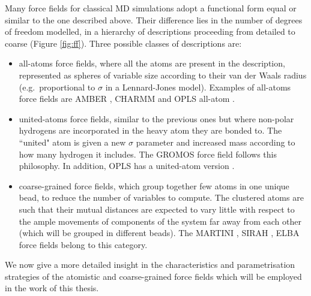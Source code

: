 Many force fields for classical MD simulations adopt a functional form equal or similar to the one described above. Their difference lies in the number of degrees of freedom modelled, in a hierarchy of descriptions proceeding from detailed to coarse (Figure \ref{fig:ff}). Three possible classes of descriptions are:
\begin{itemize}
\item all-atoms force fields, where all the atoms are present in the description, represented as spheres of variable size according to their van der Waals radius (e.g.\ proportional to $\sigma$ in a Lennard-Jones model). Examples of all-atoms force fields are AMBER \citep{Maier2015,Dickson2014,Wang2004_amber}, CHARMM \citep{MacKerell1998,Klauda2010,Huang2013} and OPLS all-atom \citep{Jorgensen1988}.
\item united-atoms force fields, similar to the previous ones but where non-polar hydrogens are incorporated in the heavy atom they are bonded to. The ``united" atom is given a new $\sigma$ parameter and increased mass according to how many hydrogen it includes. The GROMOS force field \citep{Oostenbrink2004,Schmid2011,Reif2012} follows this philosophy. In addition, OPLS has a united-atom version \citep{Jorgensen1996}.
\item coarse-grained force fields, which group together few atoms in one unique bead, to reduce the number of variables to compute. The clustered atoms are such that their mutual distances are expected to vary little with respect to the ample movements of components of the system far away from each other (which will be grouped in different beads). The MARTINI \citep{Marrink2007,Monticelli2008,DeJong2013}, SIRAH \citep{Machado2018,Barrera2019}, ELBA \citep{Orsi2011} force fields belong to this category.
\end{itemize}
%
We now give a more detailed insight in the characteristics and parametrisation strategies of the atomistic and coarse-grained force fields which will be employed in the work of this thesis.

